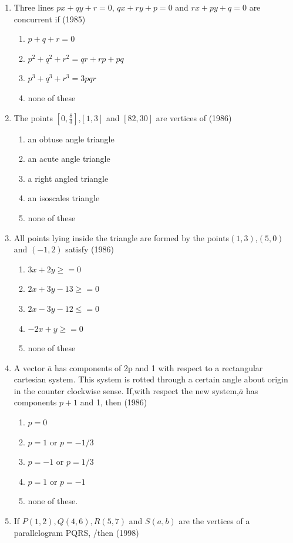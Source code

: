 \documentclass[12pt]{article}
\begin{document}
\begin{enumerate}
\item Three lines $px+qy+r=0$, $qx+ry+p=0$ and $rx+py+q=0$ are concurrent if  (1985)\\
\begin{enumerate}
\item $p+q+r=0$
\item $p^2+q^2+r^2=qr+rp+pq$
\item $p^3+q^3+r^3=3pqr$
\item none of these
\end{enumerate}
\item The points $[0,\frac{8}{3}]$,$[1,3]$ and $[82,30]$ are vertices of (1986)\\
\begin{enumerate}
\item an obtuse angle triangle
\item an acute angle triangle 
\item a  right angled triangle
\item an isoscales triangle
\item none of these
\end{enumerate}
\item All points lying inside the triangle are formed by the points$(1,3)$,$(5,0)$ and $(-1,2)$ satisfy (1986)\\
\begin{enumerate}
\item $3x+2y\ge=0$
\item $2x+3y-13\ge=0$
\item $2x-3y-12\le=0$
\item $-2x+y\ge=0$
\item none of these
\end{enumerate}
\item A vector $\bar{a}$ has components of 2p and 1 with respect to a rectangular cartesian system. This system is rotted through a certain angle about origin in the counter clockwise sense. If,with respect the new system,$\bar{a}$ has components $p+1$ and 1, then (1986)\\
\begin{enumerate}
\item $p=0$  
\item $p=1$ or  $p=-1/3$  
\item $p=-1$ or $p=1/3$ 
\item $p=1$ or  $p=-1$
\item none of these.
\end{enumerate}
\item  If $P(1,2),Q(4,6),R(5,7)$ and $S(a,b)$ are the vertices of a parallelogram PQRS, /then (1998)\\

\end{enumerate}
\end{document}
